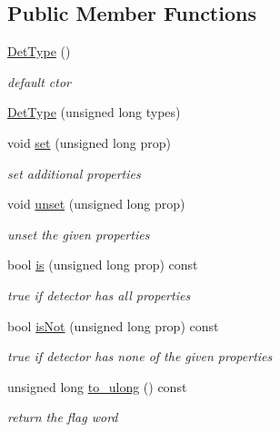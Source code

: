 \subsection*{Public Member Functions}
\begin{DoxyCompactItemize}
\item 
\hyperlink{class_d_d4hep_1_1_det_type_afd9299bbb49ac7016d966fb94ad090c8}{Det\+Type} ()
\begin{DoxyCompactList}\small\item\em default c\textquotesingle{}tor \end{DoxyCompactList}\item 
\hyperlink{class_d_d4hep_1_1_det_type_a4d20c3eee13d6a2e8856fea8e266e36b}{Det\+Type} (unsigned long types)
\item 
void \hyperlink{class_d_d4hep_1_1_det_type_ada4a0d1afa3bfa7e8d135b52af921dd3}{set} (unsigned long prop)
\begin{DoxyCompactList}\small\item\em set additional properties \end{DoxyCompactList}\item 
void \hyperlink{class_d_d4hep_1_1_det_type_aad9477be2d3a9a23cb1edb0d2435ad31}{unset} (unsigned long prop)
\begin{DoxyCompactList}\small\item\em unset the given properties \end{DoxyCompactList}\item 
bool \hyperlink{class_d_d4hep_1_1_det_type_a8f70ec4a013ffa7e58c7481b565e1ae1}{is} (unsigned long prop) const
\begin{DoxyCompactList}\small\item\em true if detector has all properties \end{DoxyCompactList}\item 
bool \hyperlink{class_d_d4hep_1_1_det_type_adf7836446a540b8e8eb10cd14887086f}{is\+Not} (unsigned long prop) const
\begin{DoxyCompactList}\small\item\em true if detector has none of the given properties \end{DoxyCompactList}\item 
unsigned long \hyperlink{class_d_d4hep_1_1_det_type_ad56a0a94170105ef04004888071b8b8f}{to\+\_\+ulong} () const
\begin{DoxyCompactList}\small\item\em return the flag word \end{DoxyCompactList}\end{DoxyCompactItemize}
